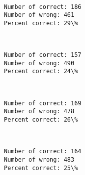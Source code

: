 \documentclass[11pt]{article}
\begin{document}
    \begin{center}
    \end{center}
    { \hspace*{\fill} \\}
    
    \begin{Verbatim}[commandchars=\\\{\}]
Number of correct: 186
Number of wrong: 461
Percent correct: 29\%

    \end{Verbatim}

    \begin{center}
    \end{center}
    { \hspace*{\fill} \\}
    
    \begin{Verbatim}[commandchars=\\\{\}]
Number of correct: 157
Number of wrong: 490
Percent correct: 24\%

    \end{Verbatim}

    \begin{center}
    \end{center}
    { \hspace*{\fill} \\}
    
    \begin{Verbatim}[commandchars=\\\{\}]
Number of correct: 169
Number of wrong: 478
Percent correct: 26\%

    \end{Verbatim}

    \begin{center}
    \end{center}
    { \hspace*{\fill} \\}
    
    \begin{Verbatim}[commandchars=\\\{\}]
Number of correct: 164
Number of wrong: 483
Percent correct: 25\%

    \end{Verbatim}
\end{document}
